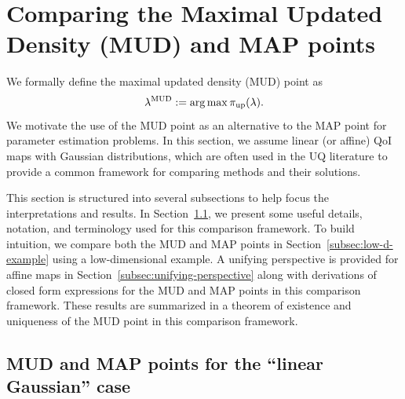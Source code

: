 \section{Comparing the Maximal Updated Density (MUD) and MAP points}\label{sec:estimation}

We formally define the maximal updated density (MUD) point as
\begin{equation}\label{eq:mudpt_inital_defn}
	\lambda^{\text{MUD}} := \operatorname*{arg\,max} {\operatorname*{\pi_{up}}}(\lambda).
\end{equation}
We motivate the use of the MUD point as an alternative to the MAP point for parameter estimation problems.
In this section, we assume linear (or affine) QoI maps with Gaussian distributions, which are often used in the UQ literature to provide a common framework for comparing methods and their solutions.

This section is structured into several subsections to help focus the interpretations and results.
In Section~\ref{subsec:Motivation}, we present some useful details, notation, and terminology used for this comparison framework.
To build intuition, we compare both the MUD and MAP points in Section~\ref{subsec:low-d-example} using a low-dimensional example.
A unifying perspective is provided for affine maps in Section~\ref{subsec:unifying-perspective} along with derivations of closed form expressions for the MUD and MAP points in this comparison framework.
These results are summarized in a theorem of existence and uniqueness of the MUD point in this comparison framework.


\subsection{MUD and MAP points for the ``linear Gaussian'' case}\label{subsec:Motivation}

